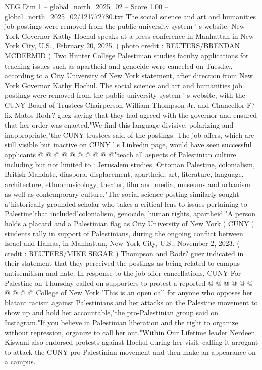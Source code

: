 \begin{textsample}{NEG Dim 1 – global\_north\_2025\_02 – Score 1.00 – global\_north\_2025\_02/121772780.txt}  \label{ex:f1_neg_006}
The social science and art and humanities job postings were removed from the public university system ' s website.
New York Governor Kathy Hochul speaks at a press conference in Manhattan in New York City, U.S., February 20, 2025. ( photo credit : REUTERS/BRENDAN MCDERMID ) Two Hunter College Palestinian studies faculty applications for teaching issues such as apartheid and genocide were canceled on Tuesday, according to a City University of New York statement, after direction from New York Governor Kathy Hochul.
The social science and art and humanities job postings were removed from the public university system ' s website, with the CUNY Board of Trustees Chairperson William Thompson Jr. and Chancellor F? lix Matos Rodr? guez saying that they had agreed with the governor and ensured that her order was enacted."We find this language divisive, polarizing and inappropriate,"the CUNY trustees said of the postings.
The job offers, which are still visible but inactive on CUNY ' s Linkedin page, would have seen successful applicants @ @ @ @ @ @ @ @ @ @"teach all aspects of Palestinian culture including but not limited to : Jerusalem studies, Ottoman Palestine, colonialism, British Mandate, diaspora, displacement, apartheid, art, literature, language, architecture, ethnomusicology, theater, film and media, museums and urbanism as well as contemporary culture."The social science posting similarly sought a"historically grounded scholar who takes a critical lens to issues pertaining to Palestine"that included"colonialism, genocide, human rights, apartheid."A person holds a placard and a Palestinian flag as City University of New York ( CUNY ) students rally in support of Palestinians, during the ongoing conflict between Israel and Hamas, in Manhattan, New York City, U.S., November 2, 2023. ( credit : REUTERS/MIKE SEGAR ) Thompson and Rodr? guez indicated in their statement that they perceived the postings as being related to campus antisemitism and hate.
In response to the job offer cancellations, CUNY For Palestine on Thursday called on supporters to protest a reported @ @ @ @ @ @ @ @ @ @ College of New York."This is an open call for anyone who opposes her blatant racism against Palestinians and her attacks on the Palestine movement to show up and hold her accountable,"the pro-Palestinian group said on Instagram."If you believe in Palestinian liberation and the right to organize without repression, organize to call her out."Within Our Lifetime leader Nerdeen Kiswani also endorsed protests against Hochul during her visit, calling it arrogant to attack the CUNY pro-Palestinian movement and then make an appearance on a campus.

\end{textsample}
